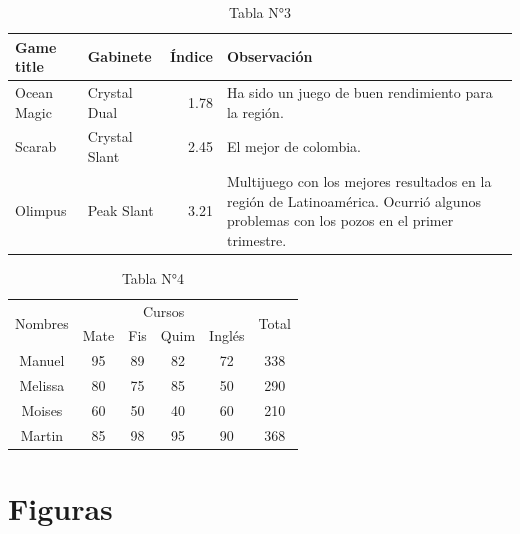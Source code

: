 \documentclass[a4paper, 11pt]{article}
\begin{document}
    \begin{table}[h]
        \centering
        \begin{tabular}{|l|l|r|m{9.25cm}|} %
            \hline
            Game title &  Gabinete & Índice & Observación\\
            \hline
            Ocean Magic &  Crystal Dual  & 1.78  & Ha sido un juego de buen rendimiento para la región. \\ 
            \hline
            Scarab & Crystal Slant  &  2.45 & El mejor de colombia.   \\ 
            \hline
            Olimpus & Peak Slant & 3.21 & Multijuego con los mejores resultados en la región de Latinoamérica. Ocurrió algunos problemas con los pozos en el primer trimestre.\\
            \hline 
        \end{tabular}
        \caption{Tabla N°3}
        \label{tab:my_label 1}
    \end{table}

    \begin{table}[H] %
        \centering
        \begin{tabular}{|c|c|c|c|c|c|}
         \hline 
         \multirow{2}{*}{Nombres} &  \multicolumn{4}{c|}{Cursos} & \multirow{2}{*}{Total}\\
         \cline{2-5}
                 & Mate & Fis & Quim & Inglés &     \\
         \hline 
         Manuel & 95 & 89 & 82 & 72 & 338\\
         \hline 
         Melissa & 80 & 75 & 85 & 50 & 290 \\
         \hline 
         Moises & 60 & 50 & 40 & 60 & 210 \\
         \hline 
         Martin & 85 & 98 & 95 & 90 & 368 \\
         \hline 
        \end{tabular}
        \caption{Tabla N°4}
        \label{tab:my_label 2}
    \end{table}


    \section{Figuras}
\end{document}
